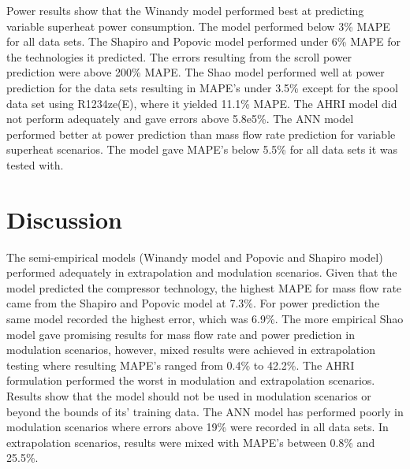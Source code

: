 \documentclass[preprint,11pt,authoryear]{elsarticle}
\begin{document}
\begin{table}[h]
\caption{Power results for variable superheat scenarios.}
\label{Tab:vspr_pwr_results}
\begin{center}
\end{center}
\end{table}

Power results show that the Winandy model performed best at predicting variable superheat power consumption. The model performed below 3\% MAPE for all data sets. The Shapiro and Popovic model performed under 6\% MAPE for the technologies it predicted. The errors resulting from the scroll power prediction were above 200\% MAPE. The Shao model performed well at power prediction for the data sets resulting in MAPE's under 3.5\% except for the spool data set using R1234ze(E), where it yielded 11.1\% MAPE. The AHRI model did not perform adequately and gave errors above 5.8e5\%. The ANN model performed better at power prediction than mass flow rate prediction for variable superheat scenarios. The model gave MAPE's below 5.5\% for all data sets it was tested with. 


\section{Discussion}
The semi-empirical models (Winandy model and Popovic and Shapiro model) performed adequately in extrapolation and modulation scenarios. Given that the model predicted the compressor technology, the highest MAPE for mass flow rate came from the Shapiro and Popovic model at 7.3\%. For power prediction the same model recorded the highest error, which was 6.9\%. The more empirical Shao model gave promising results for mass flow rate and power prediction in modulation scenarios, however, mixed results were achieved in extrapolation testing where resulting MAPE's ranged from 0.4\% to 42.2\%. The AHRI formulation performed the worst in modulation and extrapolation scenarios. Results show that the model should not be used in modulation scenarios or beyond the bounds of its' training data. The ANN model has performed poorly in modulation scenarios where errors above 19\% were recorded in all data sets. In extrapolation scenarios, results were mixed with MAPE's between 0.8\% and 25.5\%. 
\end{document}
